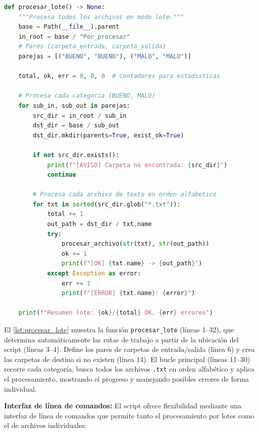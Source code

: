 \begin{lstlisting}[language=Python, caption={Función para el procesamiento por lotes de archivos.}, label={lst:procesar_lote}]
def procesar_lote() -> None:
    """Procesa todos los archivos en modo lote."""
    base = Path(__file__).parent
    in_root = base / "Por_procesar"
    # Pares (carpeta_entrada, carpeta_salida)
    parejas = [("BUENO", "BUENO"), ("MALO", "MALO")]

    total, ok, err = 0, 0, 0  # Contadores para estadisticas

    # Procesa cada categoria (BUENO, MALO)
    for sub_in, sub_out in parejas:
        src_dir = in_root / sub_in
        dst_dir = base / sub_out
        dst_dir.mkdir(parents=True, exist_ok=True)

        if not src_dir.exists():
            print(f"[AVISO] Carpeta no encontrada: {src_dir}")
            continue

        # Procesa cada archivo de texto en orden alfabetico
        for txt in sorted(src_dir.glob("*.txt")):
            total += 1
            out_path = dst_dir / txt.name
            try:
                procesar_archivo(str(txt), str(out_path))
                ok += 1
                print(f"[OK] {txt.name} -> {out_path}")
            except Exception as error:
                err += 1
                print(f"[ERROR] {txt.name}: {error}")

    print(f"Resumen lote: {ok}/{total} OK, {err} errores")
\end{lstlisting}

El \autoref{lst:procesar_lote} muestra la función \texttt{procesar\_lote} (líneas 1--32), que determina automáticamente las rutas de trabajo a partir de la ubicación del script (líneas 3--4). Define los pares de carpetas de entrada/salida (línea 6) y crea las carpetas de destino si no existen (línea 14). El bucle principal (líneas 11--30) recorre cada categoría, busca todos los archivos \texttt{.txt} en orden alfabético y aplica el procesamiento, mostrando el progreso y manejando posibles errores de forma individual.

\textbf{Interfaz de línea de comandos:} El script ofrece flexibilidad mediante una interfaz de línea de comandos que permite tanto el procesamiento por lotes como el de archivos individuales:

